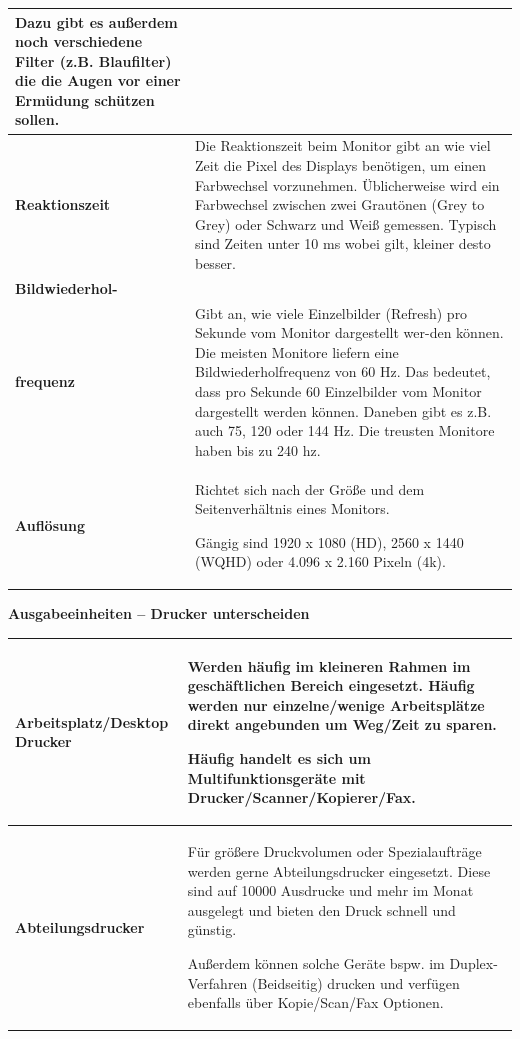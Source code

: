 \documentclass[10pt]{article}
\begin{document}
\begin{flushleft}
\begin{longtable}{|p{}|p{}|}
    Dazu gibt es außerdem noch verschiedene Filter (z.B. Blaufilter) die die Augen vor einer Ermüdung schützen sollen.
    \\\hline

    \textbf{Reaktionszeit}&
    Die Reaktionszeit beim Monitor gibt an wie viel Zeit die Pixel des Displays benötigen, um einen Farbwechsel vorzunehmen. Üblicherweise wird ein Farbwechsel zwischen zwei Grautönen (Grey to Grey) oder Schwarz und Weiß gemessen. Typisch sind Zeiten unter 10 ms wobei gilt, kleiner desto besser.
    \\\hline

    \textbf{Bildwiederhol-}\\\textbf{frequenz}&
    Gibt an, wie viele Einzelbilder (Refresh) pro Sekunde vom Monitor dargestellt wer-den können. Die meisten Monitore liefern eine Bildwiederholfrequenz von 60 Hz. Das bedeutet, dass pro Sekunde 60 Einzelbilder vom Monitor dargestellt werden können. Daneben gibt es z.B. auch 75, 120 oder 144 Hz. Die treusten Monitore haben bis zu 240 hz.
    \\\hline

    \textbf{Auflösung}&
    Richtet sich nach der Größe und dem Seitenverhältnis eines Monitors.

    Gängig sind 1920 x 1080 (HD), 2560 x 1440 (WQHD) oder 4.096 x 2.160 Pixeln (4k).

    \\\hline
\end{longtable}

\textbf{Ausgabeeinheiten – Drucker unterscheiden}

\begin{longtable}{|p{}|p{}|}
    \hline
    
    \textbf{Arbeitsplatz/Desktop Drucker}&
    Werden häufig im kleineren Rahmen im geschäftlichen Bereich eingesetzt. Häufig werden nur einzelne/wenige Arbeitsplätze direkt angebunden um Weg/Zeit zu sparen.

    Häufig handelt es sich um Multifunktionsgeräte mit Drucker/Scanner/Kopierer/Fax.
    \\\hline

    \textbf{Abteilungsdrucker}&
    Für größere Druckvolumen oder Spezialaufträge werden gerne Abteilungsdrucker eingesetzt. Diese sind auf 10000 Ausdrucke und mehr im Monat ausgelegt und bieten den Druck schnell und günstig.
    
    Außerdem können solche Geräte bspw. im Duplex-Verfahren (Beidseitig) drucken und verfügen ebenfalls über Kopie/Scan/Fax Optionen.
    

\end{longtable}
\end{flushleft}
\end{document}
